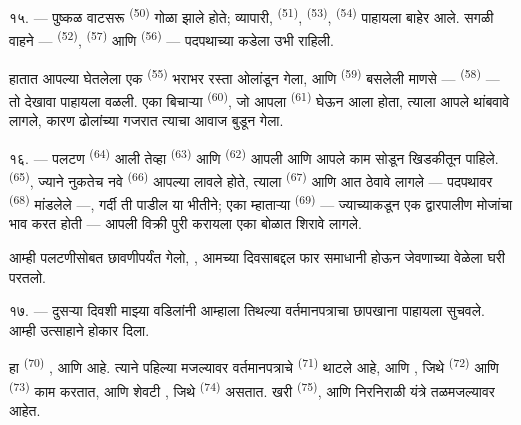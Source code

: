 १५. --- पुष्कळ वाटसरू  \textsuperscript{(50)} गोळा झाले होते; व्यापारी,
 \textsuperscript{(51)},  \textsuperscript{(53)},
 \textsuperscript{(54)}  पाहायला बाहेर आले. सगळी वाहने —
 \textsuperscript{(52)},  \textsuperscript{(57)} आणि
 \textsuperscript{(56)} — पदपथाच्या कडेला उभी राहिली.

\VUsaut{3.0mm}

हातात आपल्या  घेतलेला एक 
\textsuperscript{(55)} भराभर रस्ता ओलांडून गेला, आणि 
\textsuperscript{(59)} बसलेली माणसे —  \textsuperscript{(58)} — तो देखावा
पाहायला वळली. एका बिचाऱ्या  \textsuperscript{(60)}, जो आपला
 \textsuperscript{(61)} घेऊन आला होता, त्याला आपले 
थांबवावे लागले, कारण ढोलांच्या गजरात त्याचा आवाज बुडून गेला.

१६. --- पलटण  \textsuperscript{(64)} आली तेव्हा
 \textsuperscript{(63)} आणि  \textsuperscript{(62)}
आपली  आणि आपले काम सोडून खिडकीतून पाहिले. 
\textsuperscript{(65)}, ज्याने नुकतेच नवे  \textsuperscript{(66)} आपल्या
 लावले होते, त्याला  \textsuperscript{(67)} आणि  आत
ठेवावे लागले — पदपथावर  \textsuperscript{(68)} मांडलेले —, गर्दी ती
पाडील या भीतीने; एका म्हाताऱ्या  \textsuperscript{(69)} — ज्याच्याकडून
एक द्वारपालीण मोजांचा भाव करत होती — आपली विक्री पुरी करायला एका बोळात शिरावे लागले.

आम्ही पलटणीसोबत छावणीपर्यंत गेलो, , आमच्या दिवसाबद्दल फार समाधानी होऊन जेवणाच्या
वेळेला घरी परतलो.

\VUsaut{3.0mm}

१७. --- दुसऱ्या दिवशी माझ्या वडिलांनी आम्हाला तिथल्या वर्तमानपत्राचा छापखाना पाहायला सुचवले.
आम्ही उत्साहाने होकार दिला.

 हा  \textsuperscript{(70)}  ,  आणि  आहे. त्याने पहिल्या मजल्यावर वर्तमानपत्राचे  \textsuperscript{(71)} थाटले आहे, आणि , जिथे  \textsuperscript{(72)} आणि  \textsuperscript{(73)} काम करतात, आणि शेवटी , जिथे  \textsuperscript{(74)} असतात. खरी  \textsuperscript{(75)},  आणि निरनिराळी यंत्रे तळमजल्यावर आहेत.

